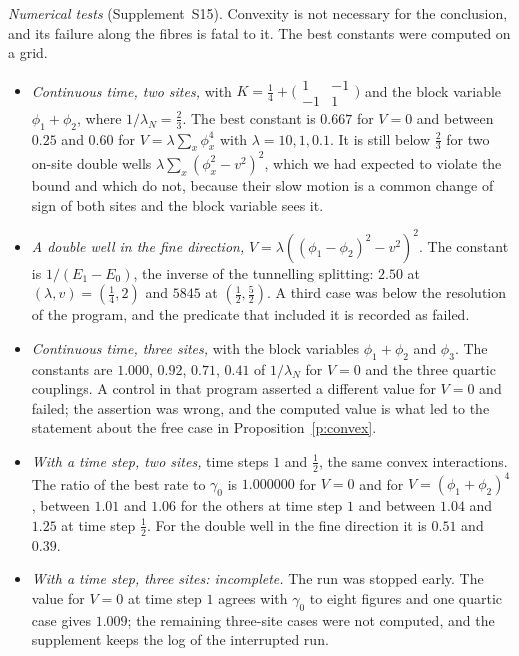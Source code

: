 \emph{Numerical tests} (Supplement~S15). Convexity is not necessary for the conclusion, and its failure
along the fibres is fatal to it. The best constants were computed on a grid.
\begin{itemize}
\item \emph{Continuous time, two sites,} with
$K=\tfrac14+\big(\begin{smallmatrix}1&-1\\-1&1\end{smallmatrix}\big)$ and the block variable
$\phi_1+\phi_2$, where $1/\lambda_N=\tfrac23$. The best constant is $0.667$ for $V=0$ and between $0.25$ and
$0.60$ for $V=\lambda\sum_x\phi_x^4$ with $\lambda=10,1,0.1$. It is still below $\tfrac23$ for two on-site
double wells $\lambda\sum_x(\phi_x^2-v^2)^2$, which we had expected to violate the bound and which do not,
because their slow motion is a common change of sign of both sites and the block variable sees it.
\item \emph{A double well in the fine direction,} $V=\lambda((\phi_1-\phi_2)^2-v^2)^2$. The constant is
$1/(E_1-E_0)$, the inverse of the tunnelling splitting: $2.50$ at $(\lambda,v)=(\tfrac14,2)$ and $5845$ at
$(\tfrac12,\tfrac52)$. A third case was below the resolution of the program, and the predicate that included
it is recorded as failed.
\item \emph{Continuous time, three sites,} with the block variables $\phi_1+\phi_2$ and $\phi_3$. The
constants are $1.000$, $0.92$, $0.71$, $0.41$ of $1/\lambda_N$ for $V=0$ and the three quartic couplings. A
control in that program asserted a different value for $V=0$ and failed; the assertion was wrong, and the
computed value is what led to the statement about the free case in Proposition~\ref{p:convex}.
\item \emph{With a time step, two sites,} time steps $1$ and $\tfrac12$, the same convex interactions. The
ratio of the best rate to $\gamma_0$ is $1.000000$ for $V=0$ and for $V=(\phi_1+\phi_2)^4$, between $1.01$
and $1.06$ for the others at time step $1$ and between $1.04$ and $1.25$ at time step $\tfrac12$. For the
double well in the fine direction it is $0.51$ and $0.39$.
\item \emph{With a time step, three sites: incomplete.} The run was stopped early. The value for $V=0$ at
time step $1$ agrees with $\gamma_0$ to eight figures and one quartic case gives $1.009$; the remaining
three-site cases were not computed, and the supplement keeps the log of the interrupted run.
\end{itemize}

